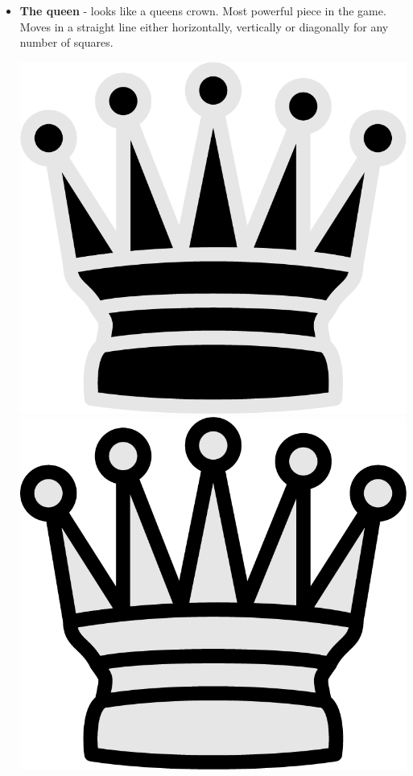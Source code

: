 \documentclass{article}
\begin{document}
\begin{itemize}
    \item \textbf{The queen} - looks like a queens crown. Most powerful piece in the game. Moves in a straight line either horizontally, vertically or diagonally for any number of squares.\\
    \begin{center}
    	\includegraphics[scale=0.1]{image14.png}
    	\includegraphics[scale=0.1]{image4.png}
    \end{center}


\end{itemize}
\end{document}
